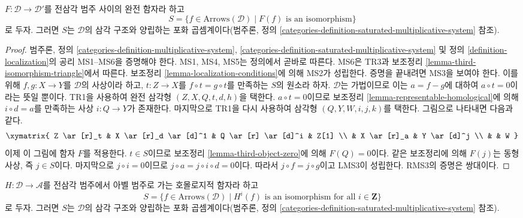 \begin{lemma}
\label{lemma-triangle-functor-localize}
$F : \mathcal{D} \to \mathcal{D}'$를 전삼각 범주 사이의 완전 함자라 하고
$$
S = \{f \in \text{Arrows}(\mathcal{D})
\mid F(f)\text{ is an isomorphism}\}
$$
로 두자. 그러면 $S$는 $\mathcal{D}$의 삼각 구조와 양립하는 포화
곱셈계이다(범주론, 정의
\ref{categories-definition-saturated-multiplicative-system} 참조).
\end{lemma}

\begin{proof}
범주론, 정의 \ref{categories-definition-multiplicative-system},
\ref{categories-definition-saturated-multiplicative-system} 및
정의 \ref{definition-localization}의 공리 MS1--MS6을 증명해야 한다.
MS1, MS4, MS5는 정의에서 곧바로 따른다. MS6은 TR3과 보조정리
\ref{lemma-third-isomorphism-triangle}에서 따른다. 보조정리
\ref{lemma-localization-conditions}에 의해 MS2가 성립한다.
증명을 끝내려면 MS3을 보여야 한다. 이를 위해 $f, g : X \to Y$를
$\mathcal{D}$의 사상이라 하고, $t : Z \to X$를
$f \circ t = g \circ t$를 만족하는 $S$의 원소라 하자.
$\mathcal{D}$는 가법이므로 이는 $a = f - g$에 대하여
$a \circ t = 0$이라는 뜻일 뿐이다. TR1을 사용하여 완전 삼각형
$(Z, X, Q, t, d, h)$을 택한다. $a \circ t = 0$이므로 보조정리
\ref{lemma-representable-homological}에 의해 $i \circ d = a$를
만족하는 사상 $i : Q \to Y$가 존재한다. 마지막으로 TR1을 다시 사용하여
삼각형 $(Q, Y, W, i, j, k)$를 택한다. 그림으로 나타내면 다음과 같다.
$$
\xymatrix{
Z \ar[r]_t & X \ar[r]_d \ar[d]^1 & Q \ar[r] \ar[d]^i & Z[1] \\
& X \ar[r]_a & Y \ar[d]^j \\
& & W
}
$$
이제 이 그림에 함자 $F$를 적용한다. $t \in S$이므로 보조정리
\ref{lemma-third-object-zero}에 의해 $F(Q) = 0$이다.
같은 보조정리에 의해 $F(j)$는 동형사상, 즉 $j \in S$이다.
마지막으로 $j \circ i = 0$이므로
$j \circ a = j \circ i \circ d = 0$이다. 따라서
$j \circ f = j \circ g$이고 LMS3이 성립한다. RMS3의 증명은 쌍대이다.
\end{proof}

\begin{lemma}
\label{lemma-homological-functor-localize}
$H : \mathcal{D} \to \mathcal{A}$를 전삼각 범주에서 아벨 범주로 가는
호몰로지적 함자라 하고
$$
S = \{f \in \text{Arrows}(\mathcal{D})
\mid H^i(f)\text{ is an isomorphism for all }i \in \mathbf{Z}\}
$$
로 두자. 그러면 $S$는 $\mathcal{D}$의 삼각 구조와 양립하는 포화
곱셈계이다(범주론, 정의
\ref{categories-definition-saturated-multiplicative-system} 참조).
\end{lemma}

